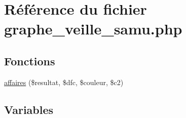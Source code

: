\hypertarget{graphe__veille__samu_8php}{
\section{R\'{e}f\'{e}rence du fichier graphe\_\-veille\_\-samu.php}
\label{graphe__veille__samu_8php}
}
\subsection*{Fonctions}
\begin{CompactItemize}
\item 
\hyperlink{graphe__veille__samu_8php_a29}{affaires} (\$resultat, \$dfc, \$couleur, \$c2)
\end{CompactItemize}
\subsection*{Variables}
